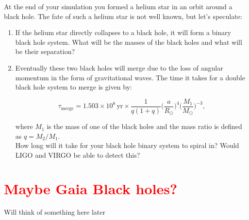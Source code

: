\documentclass[11pt,a4paper]{article}
\newcommand{\todo}[1]{\textbf{\textcolor{red}{#1}}}
\begin{document}
At the end of your simulation you formed a helium star in an orbit around a black hole. The fate of such a helium star is not well known, but let's speculate:

\begin{enumerate}
  \item If the helium star directly collapses to a black hole, it will form a binary black hole system. What will be the masses of the black holes and what will be their separation?

  \item Eventually these two black holes will merge due to the loss of angular momentum in the form of gravitational waves. The time it takes for a double black hole system to merge is given by:
  
  \begin{equation*}
  \tau_{\mathrm{merge}} = 1.503 \times 10^8\,\mathrm{yr} \times \frac{1}{q(1+q)}\bigg(\frac{a}{R_\odot}\bigg)^4\bigg(\frac{M_1}{M_\odot}\bigg)^{-3},
  \end{equation*}
  
  where $M_1$ is the mass of one of the black holes and the mass ratio is defined as $q=M_2/M_1$.\\[1ex]
  How long will it take for your black hole binary system to spiral in? Would LIGO and VIRGO be able to detect this?

\end{enumerate}



\section{\todo{Maybe Gaia Black holes? }}
Will think of something here later






% 
% 
\end{document}
